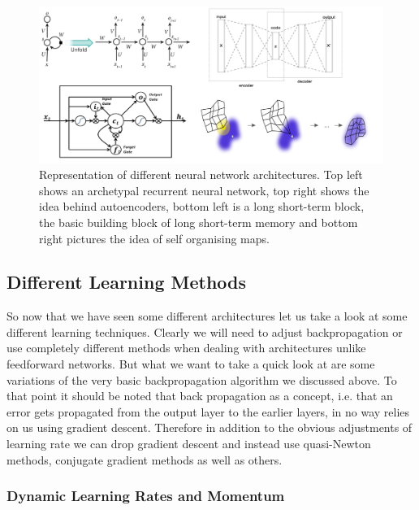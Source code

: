 \documentclass[preprint,12pt,3p]{elsarticle}
\begin{document}
\begin{figure}
    \centering
    \includegraphics[scale=0.45]{figures/ANNs3}
    \caption{Representation of different neural network architectures. Top left shows an archetypal recurrent neural network, top right shows the idea behind autoencoders, bottom left is a long short-term block, the basic building block of long short-term memory and bottom right pictures the idea of self organising maps.}
    \label{fig:ANNs3}
\end{figure}

\subsection{Different Learning Methods}
So now that we have seen some different architectures let us take a look at some different learning techniques. 
Clearly we will need to adjust backpropagation or use completely different methods when dealing with architectures unlike feedforward networks. But what we want to take a quick look at are some variations of the very basic backpropagation algorithm we discussed above. To that point it should be noted that back propagation as a concept, i.e. that an error gets propagated from the output layer to the earlier layers, in no way relies on us using gradient descent. Therefore in addition to the obvious adjustments of learning rate we can drop gradient descent and instead use quasi-Newton methods, conjugate gradient methods as well as others.

\subsubsection{Dynamic Learning Rates and Momentum}
\end{document}
